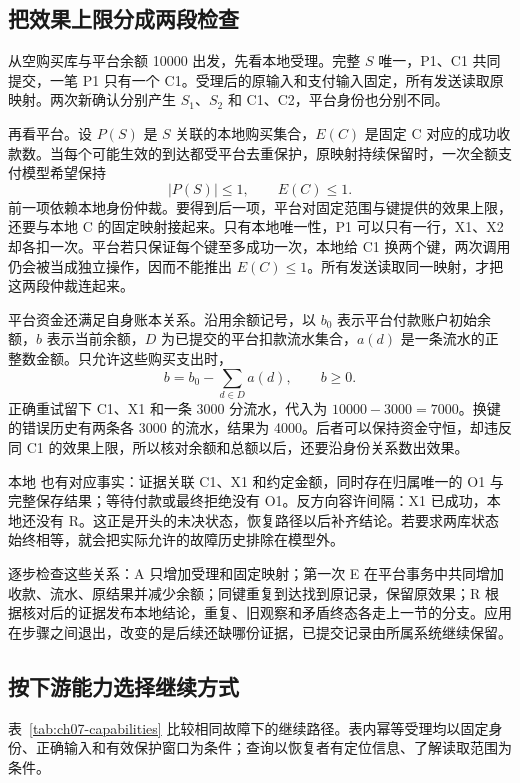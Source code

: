 \subsection*{把效果上限分成两段检查}

从空购买库与平台余额 10000 出发，先看本地受理。完整 \(S\) 唯一，P1、C1 共同提交，一笔 P1 只有一个 C1。受理后的原输入和支付输入固定，所有发送读取原映射。两次新确认分别产生 \(S_1\)、\(S_2\) 和 C1、C2，平台身份也分别不同。

再看平台。设 \(P(S)\) 是 \(S\) 关联的本地购买集合，\(E(C)\) 是固定 C 对应的成功收款数。当每个可能生效的到达都受平台去重保护，原映射持续保留时，一次全额支付模型希望保持
\[
 |P(S)|\leq 1,\qquad E(C)\leq 1.
\]
前一项依赖本地身份仲裁。要得到后一项，平台对固定范围与键提供的效果上限，还要与本地 C 的固定映射接起来。只有本地唯一性，P1 可以只有一行，X1、X2 却各扣一次。平台若只保证每个键至多成功一次，本地给 C1 换两个键，两次调用仍会被当成独立操作，因而不能推出 \(E(C)\leq 1\)。所有发送读取同一映射，才把这两段仲裁连起来。


平台资金还满足自身账本关系。沿用余额记号，以 \(b_0\) 表示平台付款账户初始余额，\(b\) 表示当前余额，\(D\) 为已提交的平台扣款流水集合，\(a(d)\) 是一条流水的正整数金额。只允许这些购买支出时，
\[
 b=b_0-\sum_{d\in D}a(d),\qquad b\geq 0.
\]
正确重试留下 C1、X1 和一条 3000 分流水，代入为 \(10000-3000=7000\)。换键的错误历史有两条各 3000 的流水，结果为 4000。后者可以保持资金守恒，却违反同 C1 的效果上限，所以核对余额和总额以后，还要沿身份关系数出效果。

本地  也有对应事实：证据关联 C1、X1 和约定金额，同时存在归属唯一的 O1 与完整保存结果；等待付款或最终拒绝没有 O1。反方向容许间隔：X1 已成功，本地还没有 R。这正是开头的未决状态，恢复路径以后补齐结论。若要求两库状态始终相等，就会把实际允许的故障历史排除在模型外。

逐步检查这些关系：A 只增加受理和固定映射；第一次 E 在平台事务中共同增加收款、流水、原结果并减少余额；同键重复到达找到原记录，保留原效果；R 根据核对后的证据发布本地结论，重复、旧观察和矛盾终态各走上一节的分支。应用在步骤之间退出，改变的是后续还缺哪份证据，已提交记录由所属系统继续保留。

\subsection*{按下游能力选择继续方式}

表~\ref{tab:ch07-capabilities} 比较相同故障下的继续路径。表内幂等受理均以固定身份、正确输入和有效保护窗口为条件；查询以恢复者有定位信息、了解读取范围为条件。

